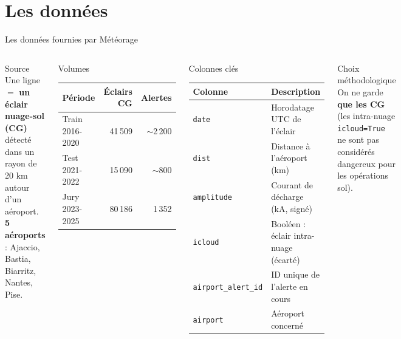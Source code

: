 \documentclass[aspectratio=169,t,11pt]{beamer}
\begin{document}
\section{Les données}

\begin{frame}{Les données fournies par Météorage}
\vspace{-2pt}
\begin{columns}[T]

\begin{block}{Source}
\small
Une ligne $=$ \textbf{un éclair nuage-sol (CG)} détecté dans un rayon de
20 km autour d'un aéroport.\\[3pt]
\textbf{5 aéroports} : Ajaccio, Bastia, Biarritz, Nantes, Pise.
\end{block}
\vspace{4pt}
\begin{block}{Volumes}
\small
\begin{tabular}{lrr}
\toprule
\textbf{Période} & \textbf{Éclairs CG} & \textbf{Alertes} \\
\midrule
Train  2016-2020 & 41\,509  & $\sim$2\,200 \\
Test   2021-2022 & 15\,090  & $\sim$800    \\
Jury   2023-2025 & 80\,186  & 1\,352       \\
\bottomrule
\end{tabular}
\end{block}

\begin{block}{Colonnes clés}
\footnotesize
\begin{tabular}{ll}
\toprule
\textbf{Colonne} & \textbf{Description} \\
\midrule
\texttt{date}              & Horodatage UTC de l'éclair \\
\texttt{dist}              & Distance à l'aéroport (km) \\
\texttt{amplitude}         & Courant de décharge (kA, signé) \\
\texttt{icloud}            & Booléen : éclair intra-nuage (écarté) \\
\texttt{airport\_alert\_id} & ID unique de l'alerte en cours \\
\texttt{airport}           & Aéroport concerné \\
\bottomrule
\end{tabular}
\end{block}
\vspace{4pt}
\begin{alertblock}{Choix méthodologique}
\footnotesize
On ne garde \textbf{que les CG} (les intra-nuage \texttt{icloud=True}
ne sont pas considérés dangereux pour les opérations sol).
\end{alertblock}
\end{columns}
\end{frame}
\end{document}
